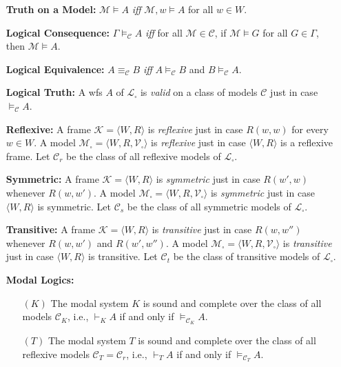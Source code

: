 \documentclass[a4paper, 11pt]{article} %
\newcommand{\tuple}[1]{\langle#1\rangle} %
\newcommand{\M}[0]{\mathcal{M}}
\begin{document}
\begin{enumerate}[leftmargin=1.2in,labelsep=.15in] %
\item[\bf Truth on a Model:] $\M\vDash A$ \textit{iff} $\M,w\vDash A$ for all $w\in W$.
\item[\bf Logical Consequence:] $\Gamma\vDash_\mathcal{C} A$ \textit{iff} for all $\mathcal{M}\in\mathcal{C}$, if $\mathcal{M}\vDash G$ for all $G\in\Gamma$, then $\mathcal{M}\vDash  A$.
\item[\bf Logical Equivalence:] $A\equiv_\mathcal{C} B$ \textit{iff} $A\vDash_\mathcal{C} B$ and $B\vDash_\mathcal{C} A$.  
\item[\bf Logical Truth:] A wfs $A$ of $\mathcal{L}_\square$ is \textit{valid} on a class of models $\mathcal{C}$ just in case $\vDash_\mathcal{C} A$.%
\item[\bf Reflexive:] A frame $\mathcal{K}=\tuple{W,R}$ is \textit{reflexive} just in case $R(w,w)$ for every $w\in W$. A model $\mathcal{M}_\square=\tuple{W,R,\mathcal{V}_\square}$ is \textit{reflexive} just in case $\tuple{W,R}$ is a reflexive frame. Let $\mathcal{C}_r$ be the class of all reflexive models of $\mathcal{L}_\square$.
\item[\bf Symmetric:] A frame $\mathcal{K}=\tuple{W,R}$ is \textit{symmetric} just in case $R(w',w)$ whenever $R(w,w')$. A model $\mathcal{M}_\square=\tuple{W,R,\mathcal{V}_\square}$ is \textit{symmetric} just in case $\tuple{W,R}$ is symmetric. Let $\mathcal{C}_s$ be the class of all symmetric models of $\mathcal{L}_\square$.
\item[\bf Transitive:] A frame $\mathcal{K}=\tuple{W,R}$ is \textit{transitive} just in case $R(w,w'')$ whenever $R(w,w')$ and $R(w',w'')$. A model $\mathcal{M}_\square=\tuple{W,R,\mathcal{V}_\square}$ is \textit{transitive} just in case $\tuple{W,R}$ is transitive. Let $\mathcal{C}_t$ be the class of transitive models of $\mathcal{L}_\square$.
\item[\bf Modal Logics:]
	\begin{enumerate}
	\item[$(K)$] The modal system $K$ is sound and complete over the class of all models $\mathcal{C}_K$, i.e., $\vdash_K A$ if and only if $\vDash_{\mathcal{C}_K} A$.
	\item[$(T)$] The modal system $T$ is sound and complete over the class of all reflexive models $\mathcal{C}_T=\mathcal{C}_r$, i.e., $\vdash_T A$ if and only if $\vDash_{\mathcal{C}_T} A$.

\end{enumerate}
\end{enumerate}
\end{document}
